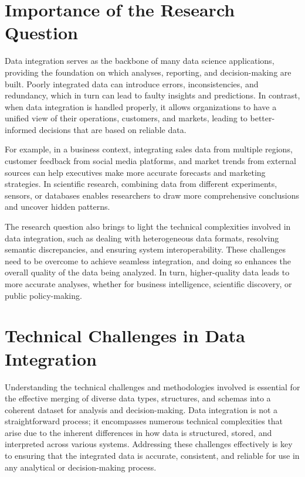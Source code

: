 \documentclass[12pt]{article}
\begin{document}
\section{Importance of the Research Question}
Data integration serves as the backbone of many data science applications, providing the foundation on which analyses, reporting, and decision-making are built. Poorly integrated data can introduce errors, inconsistencies, and redundancy, which in turn can lead to faulty insights and predictions. In contrast, when data integration is handled properly, it allows organizations to have a unified view of their operations, customers, and markets, leading to better-informed decisions that are based on reliable data.

For example, in a business context, integrating sales data from multiple regions, customer feedback from social media platforms, and market trends from external sources can help executives make more accurate forecasts and marketing strategies. In scientific research, combining data from different experiments, sensors, or databases enables researchers to draw more comprehensive conclusions and uncover hidden patterns.

The research question also brings to light the technical complexities involved in data integration, such as dealing with heterogeneous data formats, resolving semantic discrepancies, and ensuring system interoperability. These challenges need to be overcome to achieve seamless integration, and doing so enhances the overall quality of the data being analyzed. In turn, higher-quality data leads to more accurate analyses, whether for business intelligence, scientific discovery, or public policy-making.

\section{Technical Challenges in Data Integration}
Understanding the technical challenges and methodologies involved is essential for the effective merging of diverse data types, structures, and schemas into a coherent dataset for analysis and decision-making. Data integration is not a straightforward process; it encompasses numerous technical complexities that arise due to the inherent differences in how data is structured, stored, and interpreted across various systems. Addressing these challenges effectively is key to ensuring that the integrated data is accurate, consistent, and reliable for use in any analytical or decision-making process.
\end{document}

